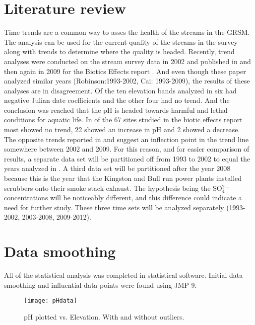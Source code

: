 \section{Literature review}
Time trends are a common way to asses the health of the streams in the GRSM.
The analysis can be used for the current quality of the streams in the survey along with trends to determine where the quality is headed. 
Recently, trend analyses were conducted on the stream survey data in 2002 and published in \citet{robinson2008ph} and then again in 2009 for the Biotics Effects report \citep{cai2012}.
And even though these paper analyzed similar years (Robinson:1993-2002, Cai: 1993-2009), the results of these analyses are in disagreement.
Of the ten elevation bands analyzed in \citet{robinson2008ph} six had negative Julian date coefficients and the other four had no trend.
And the conclusion was reached that the pH is headed towards harmful and lethal conditions for aquatic life. 
In \citet{cai2012} of the 67 sites studied in the biotic effects report most showed no trend, 22 showed an increase in pH and 2 showed a decrease. 
The opposite trends reported in  \citet{robinson2008ph} and \citet{cai2012} suggest an inflection point in the trend line somewhere between 2002 and 2009. 
For this reason, and for easier comparison of results,  a separate data set will be partitioned off from 1993 to 2002 to equal the years analyzed in \citet{robinson2008ph}.  
A third data set will be partitioned after the year 2008 because this is the year that the Kingston and Bull run power plants installed scrubbers onto their smoke stack exhaust. 
The hypothesis being the SO$_4^{2-}$ concentrations will be noticeably different, and this difference could indicate a need for further study. 
These three time sets will be analyzed separately (1993-2002, 2003-2008, 2009-2012).

\section{Data smoothing}

All of the statistical analysis was completed in statistical software. 
Initial data smoothing and influential data points were found using JMP 9. 

\begin{figure}[h!]
\centering
  \texttt{[image: pHdata]}\\
  \caption{pH plotted vs. Elevation.  With and without outliers.}\label{fig:pHdata}
\end{figure}

